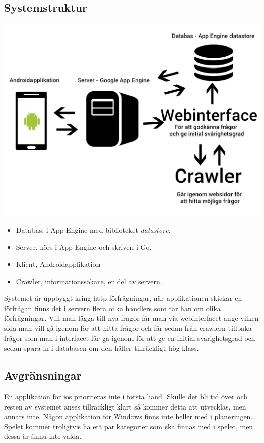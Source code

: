 \documentclass[swedish,12pt,a4paper]{article}
\begin{document}
\subsection{Systemstruktur}

\includegraphics[scale=0.2]{systemstruktur.jpg} 

\begin{itemize}
\item Databas, i App Engine med biblioteket \textit{datastore}.
\item Server, körs i App Engine och skriven i Go.
\item Klient, Androidapplikation
\item Crawler, informationssökare, en del av servern.
\end{itemize}

Systemet är uppbyggt kring http förfrågningar, när applikationen skickar en förfrågan finns det i servern flera oilka handlers som tar han om olika förfrågningar. Vill man lägga till nya frågor får man via webinterfacet ange vilken sida man vill gå igenom för att hitta frågor och får sedan från crawlern tillbaka frågor som man i interfacet får gå igenom för att ge en initial svårighetsgrad och sedan spara in i databasen om den håller tillräckligt hög klass.



\subsection{Avgränsningar}
En applikation för ios prioriteras inte i första hand. Skulle det bli tid över och resten av systemet anses tillräckligt klart så kommer detta att utvecklas, men annars inte. Någon applikation för Windows finns inte heller med i planeringen. Spelet kommer troligtvis ha ett par kategorier som ska finnas med i spelet, men dessa är ännu inte valda.
\end{document}

